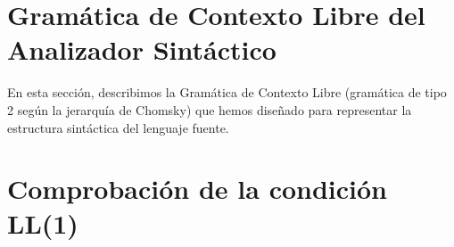 \documentclass{article}
\begin{document}
\newpage

\section{Gramática de Contexto Libre del Analizador Sintáctico}

En esta sección, describimos la Gramática de Contexto Libre (gramática de tipo 2 según la jerarquía de Chomsky) que hemos diseñado para representar la estructura sintáctica del lenguaje fuente.



\newpage

\section{Comprobación de la condición LL(1)}



\newpage


\end{document}
